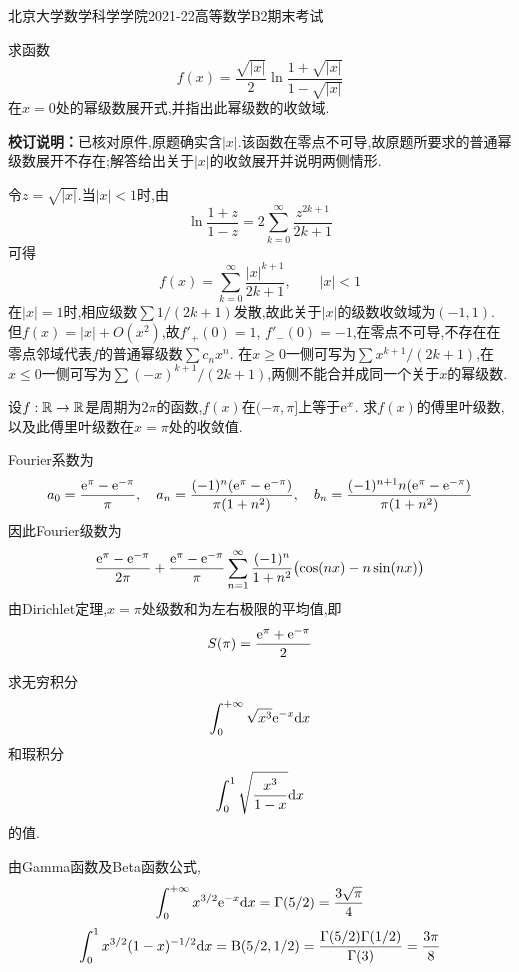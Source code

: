 \documentclass{ctexart}
\begin{document}
\pagestyle{empty}
\begin{center}\Large
    北京大学数学科学学院2021-22高等数学B2期末考试
\end{center}
\begin{problem}[1.(10\songti{分})]
求函数
        \[f(x)=\dfrac{\sqrt{|x|}}{2}\ln\dfrac{1+\sqrt{|x|}}{1-\sqrt{|x|}}\]
        在$x=0$处的幂级数展开式,并指出此幂级数的收敛域.
\par\textbf{校订说明：}已核对原件,原题确实含$|x|$.该函数在零点不可导,故原题所要求的普通幂级数展开不存在;解答给出关于$|x|$的收敛展开并说明两侧情形.
\end{problem}
\begin{solution}
令$z=\sqrt{|x|}$.当$|x|<1$时,由
\[\ln\frac{1+z}{1-z}=2\sum_{k=0}^{\infty}\frac{z^{2k+1}}{2k+1}\]
可得
\[f(x)=\sum_{k=0}^{\infty}\frac{|x|^{k+1}}{2k+1},\qquad |x|<1\]
在$|x|=1$时,相应级数$\sum1/(2k+1)$发散,故此关于$|x|$的级数收敛域为$(-1,1)$.
但$f(x)=|x|+O(x^2)$,故$f'_+(0)=1$, $f'_-(0)=-1$,在零点不可导,不存在在零点邻域代表$f$的普通幂级数$\sum c_nx^n$.
在$x\geqslant0$一侧可写为$\sum x^{k+1}/(2k+1)$,在$x\leqslant0$一侧可写为$\sum(-x)^{k+1}/(2k+1)$,两侧不能合并成同一个关于$x$的幂级数.
\end{solution}

\begin{problem}[2.(15\songti{分})]
设$f:\mathbb{R}\to\mathbb{R}$是周期为$2\pi$的函数,$f(x)$在$(-\pi,\pi]$上等于$\mathrm{e}^x$.%
        求$f(x)$的傅里叶级数,以及此傅里叶级数在$x=\pi$处的收敛值.
\end{problem}
\begin{solution}
Fourier系数为
\[a_0=\frac{\mathrm{e}^\pi-\mathrm{e}^{-\pi}}\pi,\quad
a_n=\frac{(-1)^n(\mathrm{e}^\pi-\mathrm{e}^{-\pi})}{\pi(1+n^2)},\quad
b_n=\frac{(-1)^{n+1}n(\mathrm{e}^\pi-\mathrm{e}^{-\pi})}{\pi(1+n^2)}\]
因此Fourier级数为
\[\frac{\mathrm{e}^\pi-\mathrm{e}^{-\pi}}{2\pi}+
\frac{\mathrm{e}^\pi-\mathrm{e}^{-\pi}}\pi\sum_{n=1}^{\infty}\frac{(-1)^n}{1+n^2}
\bigl(\cos(nx)-n\sin(nx)\bigr)\]
由Dirichlet定理,$x=\pi$处级数和为左右极限的平均值,即
\[S(\pi)=\frac{\mathrm{e}^\pi+\mathrm{e}^{-\pi}}2\]
\end{solution}

\begin{problem}[3.(10\songti{分})]
求无穷积分
        \[\int_0^{+\infty}\sqrt{x^3}\mathrm{e}^{-x}\mathrm{d} x\]
        和瑕积分
        \[\int_0^1\sqrt{\dfrac{x^3}{1-x}}\mathrm{d} x\]
        的值.
\end{problem}
\begin{solution}
由Gamma函数及Beta函数公式,
\[\int_0^{+\infty}x^{3/2}\mathrm{e}^{-x}\mathrm{d} x
=\Gamma(5/2)=\frac{3\sqrt\pi}{4}\]
\[\int_0^1x^{3/2}(1-x)^{-1/2}\mathrm{d} x
=\mathrm B(5/2,1/2)=\frac{\Gamma(5/2)\Gamma(1/2)}{\Gamma(3)}=\frac{3\pi}{8}\]
\end{solution}
\end{document}
